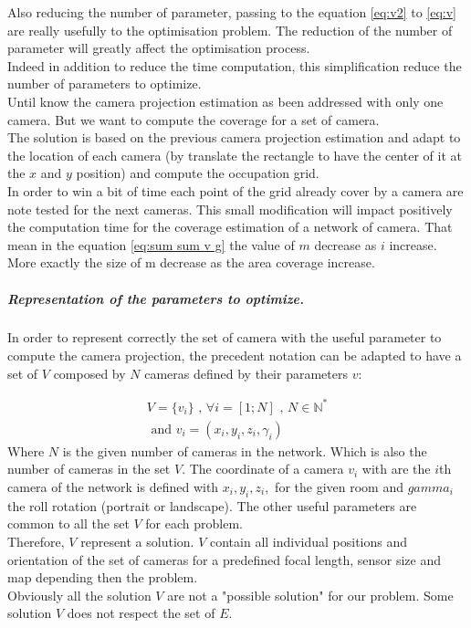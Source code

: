 Also reducing the number of  parameter, passing to the equation \ref{eq:v2} to \ref{eq:v} are really usefully to the optimisation problem. The reduction of the number of parameter will  greatly affect the optimisation process.\\
 Indeed in addition to reduce the time computation, this simplification reduce the number of parameters to optimize.\\   

Until know the camera projection estimation as been addressed with only one camera. But we want to compute the coverage for a set of camera. \\
The solution is based on the previous camera projection estimation and adapt to the location of each camera (by translate the rectangle to have the center of it at the $x$ and $y$ position) and compute the occupation grid.\\

In order to win a bit of time each point of the grid already cover by a camera are note tested for the next cameras. This small modification will impact positively the computation time for the coverage estimation of a network of camera. That mean in the equation \ref{eq:sum sum v g} the value of $m$ decrease as $i$ increase. More exactly  the size of m decrease as  the area coverage increase.  
\\

\subparagraph*{ Representation of the parameters to optimize.\\ }
In order to represent correctly the set of camera with the useful parameter to compute the camera projection, the precedent notation can be adapted to have a set of $V$ composed by $N$ cameras defined by their parameters $v$:

	\begin{equation}\label{eq:V}
		\begin{split}
			V= \{v_i\} \mbox{  , } \forall i=[1;N] \mbox{ , } N\in \mathbb{N}^*
				\\
			\mbox{ and } v_i= (x_i,y_i,z_i,\gamma_i)
		\end{split}
	\end{equation}
\noindent Where $N$ is the given number of cameras in the network. Which is also the number of cameras in the set $V$. The coordinate of a camera $v_i$ with are the $i$th camera of the network is defined  with $x_i, y_i, z_i,$ for the given room and $gamma_i$ the roll rotation (portrait or landscape). The other  useful parameters are common to all the set $V$  for each problem.\\
Therefore, $V$ represent a solution. $V$ contain all individual positions and orientation of the set of cameras for a predefined focal length, sensor size and map depending then the problem.\\%
Obviously all the solution $V$ are not a "possible solution" for our problem. Some solution $V$ does not respect the set of $E$.

